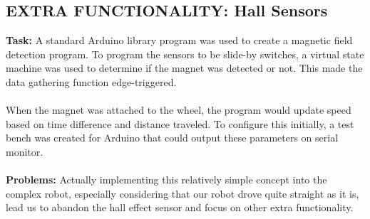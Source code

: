 \documentclass[paper=a4, fontsize=11pt]{scrartcl}
\numberwithin{equation}{section}		%
\numberwithin{figure}{section}			%
\numberwithin{table}{section}				%
\begin{document}
{\subsection{EXTRA FUNCTIONALITY: Hall Sensors}
\textbf{Task: }A standard Arduino library program was used to create a magnetic field detection program. To program the sensors to be slide-by switches, a virtual state machine was used to determine if the magnet was detected or not. This made the data gathering function edge-triggered. 
\\\\
When the magnet was attached to the wheel, the program would update speed based on time difference and distance traveled. To configure this initially, a test bench was created for Arduino that could output these parameters on serial monitor.
\\\\
\textbf{Problems: }Actually implementing this relatively simple concept into the complex robot, especially considering that our robot drove quite straight as it is, lead us to abandon the hall effect sensor and focus on other extra functionality.
\\\\
}
\end{document}
